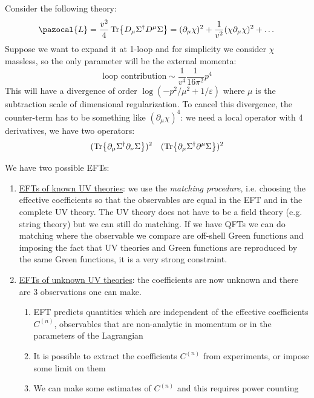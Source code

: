 \documentclass[../main.tex]{subfiles}
\begin{document}
\begin{example}
Consider the following theory:
\[
\pazocal{L}=\frac{v^2}{4}\Tr{D_\mu\Sigma^\dagger D^\mu\Sigma}=(\partial_\mu\chi)^2+\frac{1}{v^2}(\chi\partial_\mu\chi)^2+\dots
\]
Suppose we want to expand it at 1-loop and for simplicity we consider $\chi$ massless, so the only parameter will be the external momenta:
\[
\text{loop contribution}\sim\frac{1}{v^4}\frac{1}{16\pi^2}p^4
\]
This will have a divergence of order $\log(-p^2/\mu^2+1/\varepsilon)$ where $\mu$ is the subtraction scale of dimensional regularization. To cancel this divergence, the counter-term has to be something like $(\partial_\mu\chi)^4$: we need a local operator with 4 derivatives, we have two operators:
\[
(\Tr{\partial_\mu\Sigma^\dagger\partial_\nu\Sigma})^2 \quad (\Tr{\partial_\mu\Sigma^\dagger\partial^\mu\Sigma})^2
\]
\end{example}
We have two possible EFTs:
\begin{enumerate}
    \item \underline{EFTs of known UV theories}: we use the \textit{matching procedure}, i.e. choosing the effective coefficients so that the observables are equal in the EFT and in the complete UV theory. The UV theory does not have to be a field theory (e.g. string theory) but we can still do matching. If we have QFTs we can do matching where the observable we compare are off-shell Green functions and imposing the fact that UV theories and Green functions are reproduced by the same Green functions, it is a very strong constraint.
    \item \underline{EFTs of unknown UV theories}: the coefficients are now unknown and there are 3 observations one can make.
    \begin{enumerate}
        \item EFT predicts quantities which are independent of the effective coefficients $C^{(n)}$, observables that are non-analytic in momentum or in the parameters of the Lagrangian
        \item It is possible to extract the coefficients $C^{(n)}$ from experiments, or impose some limit on them
        \item We can make some estimates of $C^{(n)}$ and this requires power counting
    \end{enumerate}
\end{enumerate}
\end{document}
